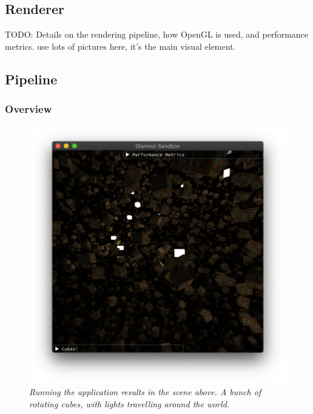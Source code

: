 \begin{multicols}{2}
  \section{Renderer}

  TODO: Details on the rendering pipeline, how OpenGL is used, and performance metrics.
  use lots of pictures here, it's the main visual element.

  \subsection{Pipeline}

  \subsubsection{Overview}

  \begin{figure}[H]
    \includegraphics[width=1\columnwidth]{../sandbox.png}
    \caption[Sandbox screenshot]{
      \emph{
        Running the application results in the scene above.
        A bunch of rotating cubes, with lights travelling around the world.
      }
    }\label{fig:sandbox-screenshot}
  \end{figure}


\end{multicols}
